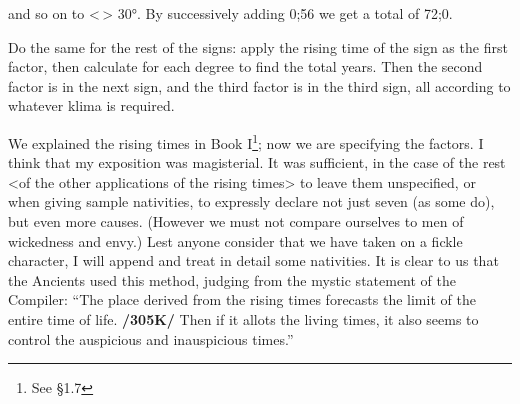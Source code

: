 and so on to <\Gemini\,> 30°. By successively adding 0;56 we get a total of 72;0.

Do the same for the rest of the signs: apply the rising time of the sign as the first factor, then calculate for each degree to find the total years. Then the second factor is in the next sign, and the third factor is in
the third sign, all according to whatever klima is required.

We explained the rising times in Book I\footnote{See \S{1.7}}; now we are specifying the factors. I think that my exposition was magisterial. It was sufficient, in the case of the rest <of the other applications of the rising
times> to leave them unspecified, or when giving sample nativities, to expressly declare not just seven (as some do), but even more causes. (However we must not compare ourselves to men of wickedness and envy.) Lest anyone consider that we have taken on a fickle character, I will append and treat in detail some nativities. It is clear to us that the Ancients used this method, judging from the mystic statement of the Compiler: “The place derived from the rising times forecasts the limit of the entire time of life. \textbf{/305K/} Then if it allots the living times, it also seems to control the auspicious and inauspicious times.”

\newpage